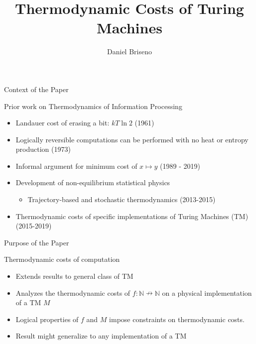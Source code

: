 \documentclass{beamer}
\title{Thermodynamic Costs of Turing Machines \parencite{Kolchinsky_2020}}
\author{Daniel Briseno}
\begin{document}
  \frame{\titlepage}
  
  

\begin{frame}{Context of the Paper}
\begin{block}{Prior work on Thermodynamics of Information Processing}
\begin{itemize}
    \item Landauer cost of erasing a bit: $kT\ln2$ (1961)
    \item Logically reversible computations can be performed with no heat or entropy production (1973)
    \item Informal argument for minimum cost of $x\mapsto y$ (1989 - 2019)
    \item Development of non-equilibrium statistical physics
    \begin{itemize}
        \item Trajectory-based and stochastic thermodynamics (2013-2015)
    \end{itemize}
    \item Thermodynamic costs of specific implementations of Turing Machines (TM)(2015-2019)
    
    
\end{itemize}
\end{block}
\end{frame}


  \begin{frame}{Purpose of the Paper}
    \begin{block}{Thermodynamic costs of computation}
    \begin{itemize}
        \item Extends results to general class of TM
        \item Analyzes the thermodynamic costs of $f:\mathbb{N} \nrightarrow \mathbb{N}$ on a physical implementation of a TM $M$
        \item Logical properties of $f$ and $M$ impose constraints on thermodynamic costs.
        \item Result might generalize to any implementation of a TM
        
    \end{itemize}
    \end{block}
\end{frame}
\end{document}
